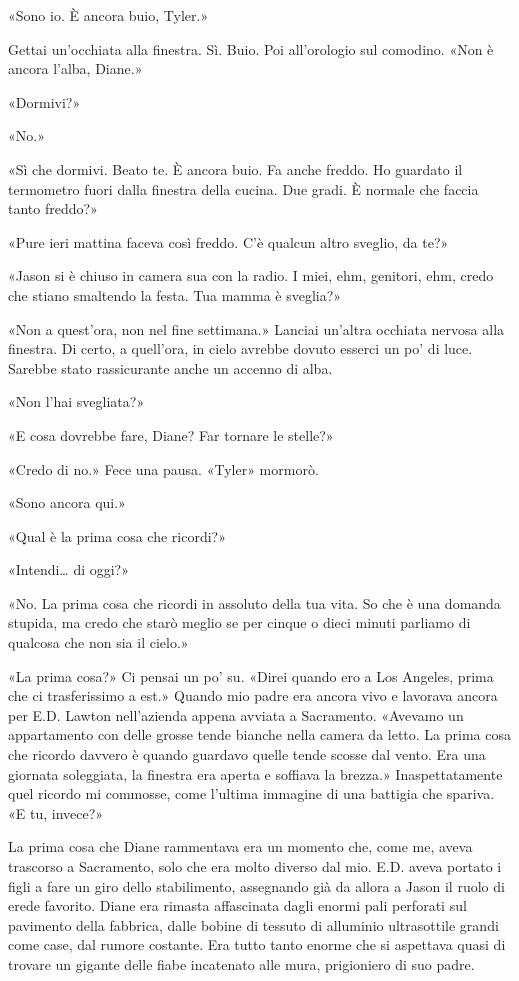 «Sono io. È ancora buio, Tyler.»

Gettai un'occhiata alla finestra. Sì. Buio. Poi all'orologio sul
comodino. «Non è ancora l'alba, Diane.»

«Dormivi?»

«No.»

«Sì che dormivi. Beato te. È ancora buio. Fa anche freddo. Ho guardato
il termometro fuori dalla finestra della cucina. Due gradi. È normale
che faccia tanto freddo?»

«Pure ieri mattina faceva così freddo. C'è qualcun altro sveglio, da
te?»

«Jason si è chiuso in camera sua con la radio. I miei, ehm, genitori,
ehm, credo che stiano smaltendo la festa. Tua mamma è sveglia?»

«Non a quest'ora, non nel fine settimana.» Lanciai un'altra occhiata
nervosa alla finestra. Di certo, a quell'ora, in cielo avrebbe dovuto
esserci un po' di luce. Sarebbe stato rassicurante anche un accenno di
alba.

«Non l'hai svegliata?»

«E cosa dovrebbe fare, Diane? Far tornare le stelle?»

«Credo di no.» Fece una pausa. «Tyler» mormorò.

«Sono ancora qui.»

«Qual è la prima cosa che ricordi?»

«Intendi\ldots{} di oggi?»

«No. La prima cosa che ricordi in assoluto della tua vita. So che è una
domanda stupida, ma credo che starò meglio se per cinque o dieci minuti
parliamo di qualcosa che non sia il cielo.»

«La prima cosa?» Ci pensai un po' su. «Direi quando ero a Los Angeles,
prima che ci trasferissimo a est.» Quando mio padre era ancora vivo e
lavorava ancora per E.D. Lawton nell'azienda appena avviata a
Sacramento. «Avevamo un appartamento con delle grosse tende bianche
nella camera da letto. La prima cosa che ricordo davvero è quando
guardavo quelle tende scosse dal vento. Era una giornata soleggiata, la
finestra era aperta e soffiava la brezza.» Inaspettatamente quel ricordo
mi commosse, come l'ultima immagine di una battigia che spariva. «E tu,
invece?»

La prima cosa che Diane rammentava era un momento che, come me, aveva
trascorso a Sacramento, solo che era molto diverso dal mio. E.D. aveva
portato i figli a fare un giro dello stabilimento, assegnando già da
allora a Jason il ruolo di erede favorito. Diane era rimasta affascinata
dagli enormi pali perforati sul pavimento della fabbrica, dalle bobine
di tessuto di alluminio ultrasottile grandi come case, dal rumore
costante. Era tutto tanto enorme che si aspettava quasi di trovare un
gigante delle fiabe incatenato alle mura, prigioniero di suo padre.

